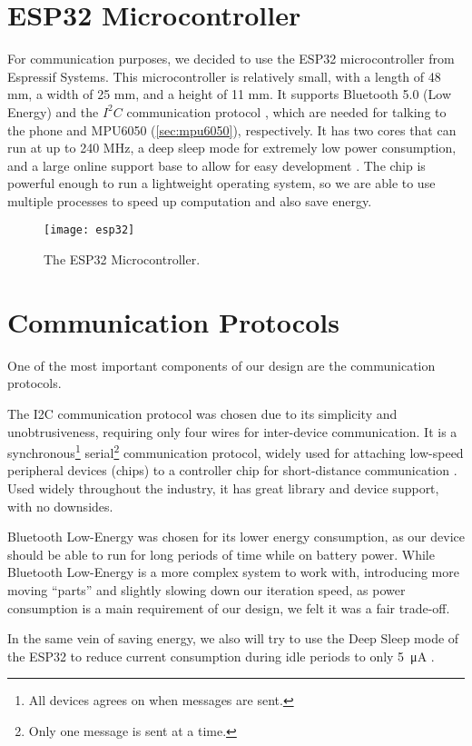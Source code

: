 \section{ESP32 Microcontroller}

For communication purposes, we decided to use the ESP32 microcontroller from
Espressif Systems. This microcontroller is relatively small, with a length of 48
mm, a width of 25 mm, and a height of 11 mm. It supports
Bluetooth 5.0 (Low Energy) and the $I^2C$ communication protocol \cite{esp32},
which are needed for talking to the phone and MPU6050 (\autoref{sec:mpu6050}),
respectively. It has two cores that can run at up to 240 MHz, a deep sleep mode
for extremely low power consumption, and a large online support base to allow
for easy development \cite{esp32}. The chip is powerful enough to run a
lightweight operating system, so we are able to use multiple processes to speed
up computation and also save energy.

\begin{figure}[h]
  \centering
  \texttt{[image: esp32]}
  \caption{The ESP32 Microcontroller.}
\end{figure}

\section{Communication Protocols}

One of the most important components of our design are the communication
protocols.

The I2C communication protocol was chosen due to its simplicity and
unobtrusiveness, requiring only four wires for inter-device communication. It is
a synchronous\footnote{All devices agrees on when messages are sent.}
serial\footnote{Only one message is sent at a time.} communication protocol,
widely used for attaching low-speed peripheral devices (chips) to a controller
chip for short-distance communication \cite{i2c}. Used widely throughout the
industry, it has great library and device support, with no downsides.

Bluetooth Low-Energy was chosen for its lower energy consumption, as our device
should be able to run for long periods of time while on battery power. While
Bluetooth Low-Energy is a more complex system to work with, introducing more
moving ``parts'' and slightly slowing down our iteration speed, as power
consumption is a main requirement of our design, we felt it was a fair
trade-off.

In the same vein of saving energy, we also will try to use the Deep
Sleep mode of the ESP32 to reduce current consumption during idle periods to only
\qty{5}{\uA} \cite{esp32}.

